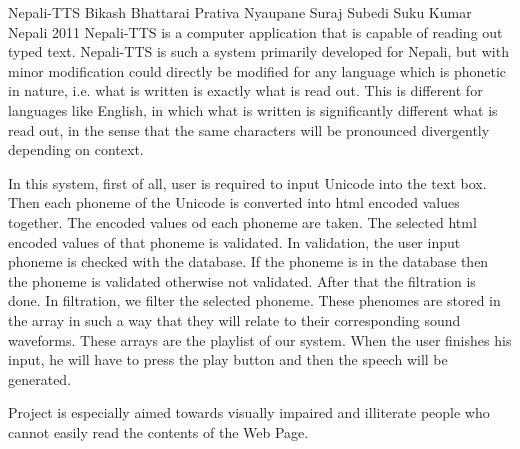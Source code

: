  \begin{conf-abstract}[]
{Nepali-TTS}
{ Bikash Bhattarai
  Prativa Nyaupane
  Suraj Subedi
  Suku Kumar Nepali 
}
{2011}
Nepali-TTS is a computer application that is capable of reading out typed text. Nepali-TTS is such a system primarily developed for Nepali, but with minor modification could directly be modified for any language which is phonetic in nature, i.e. what is written is exactly what is read out. This is different for languages like English, in which what is written is significantly different what is read out, in the sense that the same characters will be pronounced divergently depending on context.

In this system, first of all, user is required to input Unicode into the text box. Then each phoneme of the Unicode is converted into html encoded values together. The encoded values od each phoneme are taken. The selected html encoded values of that phoneme is validated. In validation, the user input phoneme is checked with the database. If the phoneme is in the database then the phoneme is validated otherwise not validated. After that the filtration is done. In filtration, we filter the selected phoneme. These phenomes are stored in the array in such a way that they will relate to their corresponding sound waveforms. These arrays are the playlist of our system. When the user finishes his input, he will have to press the play button and then the speech will be generated.

Project is especially aimed towards visually impaired and illiterate people who cannot easily read the contents of the Web Page.  
  \end{conf-abstract}